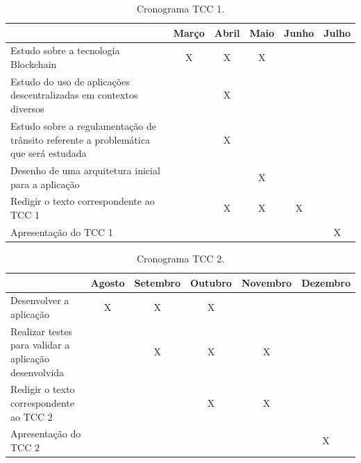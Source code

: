     
    \begin{table}[H]
        \caption{Cronograma TCC 1.}
        \begin{adjustbox}{width=\textwidth}
            \begin{tabular}{|l|c|c|c|c|c|}
            \hline
            \multicolumn{1}{|c|}{\textbf{}} & \textbf{Março} & \multicolumn{1}{l|}{\textbf{Abril}} & \multicolumn{1}{l|}{\textbf{Maio}} & \multicolumn{1}{l|}{\textbf{Junho}} & \multicolumn{1}{l|}{\textbf{Julho}} \\ \hline
            Estudo sobre a tecnologia Blockchain & X & X & X &  &  \\ \hline
            Estudo do uso de aplicações descentralizadas em contextos diversos &  & X &  &  &  \\ \hline
            Estudo sobre a regulamentação de trânsito referente a problemática que será estudada &  & X &  &  &  \\ \hline
            Desenho de uma arquitetura inicial para a aplicação &  &  & X &  &  \\ \hline
            Redigir o texto correspondente ao TCC 1 &  & X & X & X &  \\ \hline
            Apresentação do TCC 1 &  &  &  &  & X \\ \hline
            \end{tabular}
        \end{adjustbox}
        \label{tabela_cronograma_tcc1}
    \end{table}

    \begin{table}[H]
        \caption{Cronograma TCC 2.}
        \begin{adjustbox}{width=\textwidth}    
            \begin{tabular}{|l|c|c|c|c|c|}
            \hline
            \multicolumn{1}{|c|}{\textbf{}} & \textbf{Agosto} & \multicolumn{1}{l|}{\textbf{Setembro}} & \multicolumn{1}{l|}{\textbf{Outubro}} & \multicolumn{1}{l|}{\textbf{Novembro}} & \multicolumn{1}{l|}{\textbf{Dezembro}} \\ \hline
            Desenvolver a aplicação & X & X & X &  &  \\ \hline
            Realizar testes para validar a aplicação desenvolvida &  & X & X & X &  \\ \hline
            Redigir o texto correspondente ao TCC 2 &  &  & X & X &  \\ \hline
            Apresentação do TCC 2 &  &  &  &  & X \\ \hline
            \end{tabular}
        \end{adjustbox}
        \label{tabela_cronograma_tcc2}
    \end{table}
